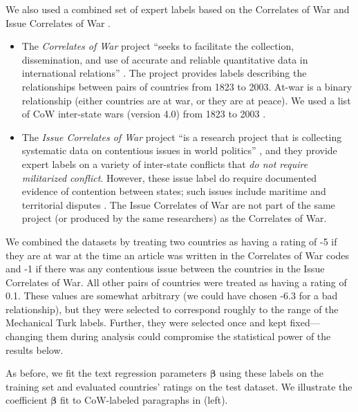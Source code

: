 We also used a combined set of expert labels based on the Correlates
of War \citep{sarkees:2010} and Issue Correlates of War
\citep{hensel:2001}.
\begin{itemize}
  \item The \emph{Correlates of War} project ``seeks to facilitate the
    collection, dissemination, and use of accurate and reliable
    quantitative data in international relations''
    \citep{cow_webpage:2012}.  The project provides labels describing the
    relationships between pairs of countries from 1823 to 2003.
    At-war is a binary relationship (either countries are at war, or
    they are at peace). We used a list of CoW inter-state wars
    (version 4.0) from 1823 to 2003
    \citep{sarkees:2010}.
  \item The \emph{Issue Correlates of War} project ``is a research
    project that is collecting systematic data on contentious issues
    in world politics'' \citep{icow_webpage:2012}, and they provide
    expert labels on a variety of inter-state conflicts that \emph{do
      not require militarized conflict}.  However, these issue label
    do require documented evidence of contention between states; such
    issues include maritime and territorial disputes
    \citep{icow_webpage:2012,hensel:2001}. The Issue Correlates of War
    are not part of the same project (or produced by the same
    researchers) as the Correlates of War.
\end{itemize}

We combined the datasets by treating two countries as having a rating
of -5 if they are at war at the time an article was written in the
Correlates of War codes and -1 if there was any contentious issue
between the countries in the Issue Correlates of War.  All other pairs
of countries were treated as having a rating of 0.1.  These values are
somewhat arbitrary (we could have chosen -6.3 for a bad relationship),
but they were selected to correspond roughly to the range of the
Mechanical Turk labels.  Further, they were selected once and kept
fixed---changing them during analysis could compromise the statistical
power of the results below.

As before, we fit the text regression parameters $\bm \beta$ using
these labels on the training set and evaluated countries' ratings on
the test dataset. We illustrate the coefficient $\bm \beta$ fit to
CoW-labeled paragraphs in  (left).

